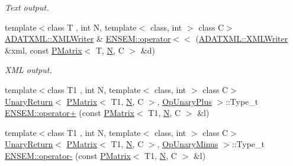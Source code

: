 \begin{DoxyCompactItemize}
\begin{DoxyCompactList}\small\item\em Text output. \end{DoxyCompactList}\item 
{\footnotesize template$<$class T , int N, template$<$ class, int $>$ class C$>$ }\\\mbox{\hyperlink{classADATXML_1_1XMLWriter}{A\+D\+A\+T\+X\+M\+L\+::\+X\+M\+L\+Writer}} \& \mbox{\hyperlink{group__primmatrix_ga88162a3095bbb5b40ba8100093befe2b}{E\+N\+S\+E\+M\+::operator$<$$<$}} (\mbox{\hyperlink{classADATXML_1_1XMLWriter}{A\+D\+A\+T\+X\+M\+L\+::\+X\+M\+L\+Writer}} \&xml, const \mbox{\hyperlink{classENSEM_1_1PMatrix}{P\+Matrix}}$<$ T, \mbox{\hyperlink{operator__name__util_8cc_a7722c8ecbb62d99aee7ce68b1752f337}{N}}, C $>$ \&d)
\begin{DoxyCompactList}\small\item\em X\+ML output. \end{DoxyCompactList}\item 
{\footnotesize template$<$class T1 , int N, template$<$ class, int $>$ class C$>$ }\\\mbox{\hyperlink{structENSEM_1_1UnaryReturn}{Unary\+Return}}$<$ \mbox{\hyperlink{classENSEM_1_1PMatrix}{P\+Matrix}}$<$ T1, \mbox{\hyperlink{operator__name__util_8cc_a7722c8ecbb62d99aee7ce68b1752f337}{N}}, C $>$, \mbox{\hyperlink{structENSEM_1_1OpUnaryPlus}{Op\+Unary\+Plus}} $>$\+::Type\+\_\+t \mbox{\hyperlink{group__primmatrix_ga0034bb2111966a353c20e6d171273d4e}{E\+N\+S\+E\+M\+::operator+}} (const \mbox{\hyperlink{classENSEM_1_1PMatrix}{P\+Matrix}}$<$ T1, \mbox{\hyperlink{operator__name__util_8cc_a7722c8ecbb62d99aee7ce68b1752f337}{N}}, C $>$ \&l)
\item 
{\footnotesize template$<$class T1 , int N, template$<$ class, int $>$ class C$>$ }\\\mbox{\hyperlink{structENSEM_1_1UnaryReturn}{Unary\+Return}}$<$ \mbox{\hyperlink{classENSEM_1_1PMatrix}{P\+Matrix}}$<$ T1, \mbox{\hyperlink{operator__name__util_8cc_a7722c8ecbb62d99aee7ce68b1752f337}{N}}, C $>$, \mbox{\hyperlink{structENSEM_1_1OpUnaryMinus}{Op\+Unary\+Minus}} $>$\+::Type\+\_\+t \mbox{\hyperlink{group__primmatrix_ga76960c32943a9f55860945f47f02de5b}{E\+N\+S\+E\+M\+::operator-\/}} (const \mbox{\hyperlink{classENSEM_1_1PMatrix}{P\+Matrix}}$<$ T1, \mbox{\hyperlink{operator__name__util_8cc_a7722c8ecbb62d99aee7ce68b1752f337}{N}}, C $>$ \&l)
\item 

\end{DoxyCompactItemize}
